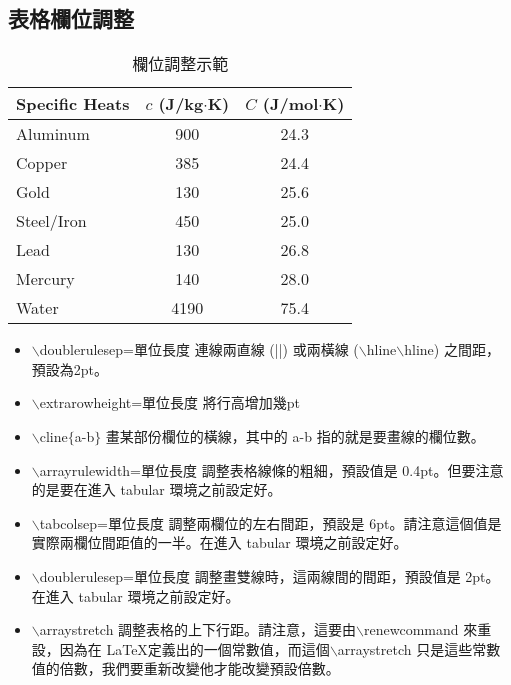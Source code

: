 \subsection{表格欄位調整}


\begin{table}[h]
    \centering
    \caption{欄位調整示範}\label{e1}
    \smallskip
\begin{center}
\extrarowheight=2pt
\doublerulesep=3pt
\renewcommand{\arraystretch}{1.2} %
\tabcolsep=12pt                   %
\begin{tabular}[b]{|lcc|}   \hline
\rowcolor[gray]{0.8}
Specific Heats & $c$ (J/kg$\cdot$K) & $C$ (J/mol$\cdot$K) \\\hline\hline
Aluminum     & 900  & 24.3 \\\cline{2-3} 
Copper       & 385  & 24.4 \\\cline{2-3} 
Gold         & 130  & 25.6 \\\cline{2-3} 
Steel/Iron   & 450  & 25.0 \\\cline{2-3} 
Lead         & 130  & 26.8 \\\cline{2-3} 
Mercury      & 140  & 28.0 \\\cline{2-3} 
Water        & 4190 & 75.4 \\\hline
\end{tabular}
\end{center}
\end{table}

\begin{itemize}
\item $\backslash$doublerulesep=單位長度 連線兩直線 (||) 或兩橫線 ($\backslash$hline$\backslash$hline) 之間距，預設為2pt。
\item $\backslash$extrarowheight=單位長度 將行高增加幾pt
\item $\backslash$cline$\lbrace$a-b$\rbrace$ 畫某部份欄位的橫線，其中的 a-b 指的就是要畫線的欄位數。
\item $\backslash$arrayrulewidth=單位長度 調整表格線條的粗細，預設值是 0.4pt。但要注意的是要在進入 tabular 環境之前設定好。
\item $\backslash$tabcolsep=單位長度 調整兩欄位的左右間距，預設是 6pt。請注意這個值是實際兩欄位間距值的一半。在進入 tabular 環境之前設定好。
\item $\backslash$doublerulesep=單位長度 調整畫雙線時，這兩線間的間距，預設值是 2pt。在進入 tabular 環境之前設定好。
\item $\backslash$arraystretch 調整表格的上下行距。請注意，這要由$\backslash$renewcommand 來重設，因為在 \LaTeX 定義出的一個常數值，而這個$\backslash$arraystretch 只是這些常數值的倍數，我們要重新改變他才能改變預設倍數。
\end{itemize}
\bigskip


